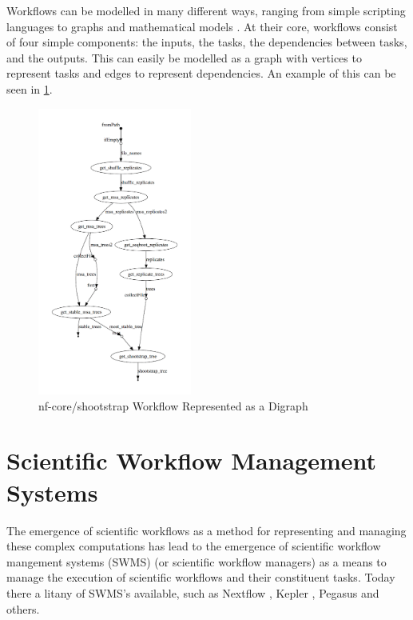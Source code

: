 Workflows can be modelled in many different ways, ranging from simple scripting languages to graphs and mathematical models \cite{Shields}. At their core, workflows consist of four simple components: the inputs, the tasks, the dependencies between tasks, and the outputs. This can easily be modelled as a graph with vertices to represent tasks and edges to represent dependencies. An example of this can be seen in \ref{fig:dag}. 

\begin{figure}[ht]
    \centering
        \includegraphics[width=0.45\textwidth,height=0.675\textheight]{fig/dag.png}
        \caption{nf-core/shootstrap Workflow Represented as a Digraph \cite{dag}}
        \label{fig:dag}
\end{figure}




\section{Scientific Workflow Management Systems}
\label{sec:management}

The emergence of scientific workflows as a method for representing and managing these complex computations has lead to the emergence of scientific workflow mangement systems (SWMS) (or scientific workflow managers) as a means to manage the execution of scientific workflows and their constituent tasks. Today there a litany of SWMS’s available, such as Nextflow \cite{nextflow},  Kepler \cite{kepler},  Pegasus \cite{pegasus} and others.

